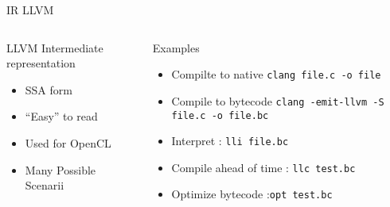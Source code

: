%
\begin{Frame}{IR LLVM}
  \begin{columns}[t]
    \begin{column}{5cm} %
      \begin{block}{LLVM Intermediate representation}
        \begin{itemize}
        \item SSA form
        \item ``Easy'' to read
        \item Used for OpenCL
        \item Many Possible Scenarii 
        \end{itemize}
      \end{block} 
    \end{column}
    
    \begin{column}{5cm} %
      \begin{block}{Examples}
        \begin{itemize}
        \item Compilte to native \texttt{clang file.c -o file}
        \item Compile to bytecode \texttt{clang -emit-llvm -S file.c -o file.bc}
        \item Interpret : \texttt{lli file.bc}
        \item Compile ahead of time : \texttt{llc test.bc}
        \item Optimize bytecode  :\texttt{opt test.bc}
        \end{itemize}
      \end{block}   
    \end{column}
  \end{columns}  
\end{Frame}


